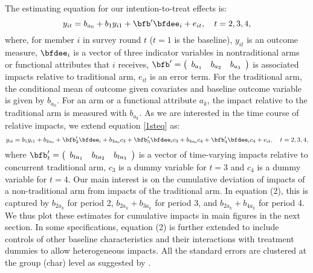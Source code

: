 	The estimating equation for our intention-to-treat effects is:
	\begin{equation}
	y_{it}=b_{a_{0}}+b_{1}y_{i1}+\bfb'\bfdee_{i}+e_{it}, \quad t=2, 3, 4,
	\label{1steq}
	\end{equation}
	where, for member $i$ in survey round $t$ ($t=1$ is the baseline), $y_{it}$ is an outcome measure, $\bfdee_{i}$ is a vector of three indicator variables in nontraditional arms or functional attributes that $i$ receives, $\bfb'=\left(
	\begin{array}{ccc}
	b_{a_{1}} & b_{a_{2}} & b_{a_{3}}
	\end{array}
	\right)$ is associated impacts relative to \textsf{traditional} arm, $e_{it}$ is an error term.  For the \textsf{traditional} arm, the conditional mean of outcome given covariates and baseline outcome variable is given by $b_{a_{0}}$. For an arm or a functional attribute $a_{k}$, the impact relative to the traditional arm is measured with $b_{a_{k}}$. As we are interested in the time course of relative impacts, we extend equation \eqref{1steq} as:
	\begin{equation}
	y_{it}=b_{1}y_{i1}+b_{2a_{0}}+\bfb'_{2}\bfdee_{i}+b_{3a_{0}}c_{3}+\bfb'_{3}\bfdee_{i}c_{3}+b_{4a_{0}}c_{4}+\bfb'_{4}\bfdee_{i}c_{4}+e_{it}, \quad t=2, 3, 4,
	\label{EstimatingEqTimeVarying}
	\end{equation}
	where $\bfb'_{t}=\left(
	\begin{array}{ccc}
	b_{ta_{1}} & b_{ta_{2}} & b_{ta_{3}}
	\end{array}
	\right)$ is a vector of time-varying impacts relative to concurrent \textsf{traditional} arm, $c_{3}$ is a dummy variable for $t=3$ and $c_{4}$ is a dummy variable for $t=4$. Our main interest is on the cumulative deviation of impacts of a non-traditional arm from impacts of the traditional arm. In equation (2), this is captured by $b_{2a_{k}}$ for period 2, $b_{2a_{k}} + b_{3a_{k}}$ for period 3, and $b_{2a_{k}} + b_{4a_{k}}$ for period 4. We thus plot these estimates for cumulative impacts in main figures in the next section. In some specifications, equation (2) is further extended to include controls of other baseline characteristics and their interactions with treatment dummies to allow heterogeneous impacts. All the standard errors are clustered at the group (char) level as suggested by \citet{AbadieAtheyImbensWooldridge2017}.%


